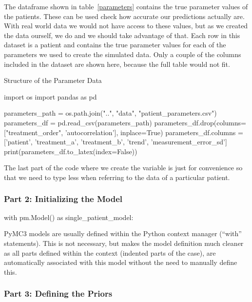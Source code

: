 \documentclass[12pt,a4paper,leqno]{report}
\theoremstyle{plain}
\theoremstyle{definition}
\theoremstyle{remark}
\begin{document}
The  dataframe shown in table\ \ref{parameters} contains the true parameter values of the patients. These
can be used check how accurate our predictions actually are. With real world data we would
not have access to these values, but as we created the data ourself, we do and we should
take advantage of that. Each row in this dataset is a patient and contains the
true parameter values for each of the parameters we used to create the simulated data.
Only a couple of the columns included in the dataset are shown here, because the full
table would not fit.

\bigskip
\begin{table}[H]
\caption{Structure of the Parameter Data}\label{parameters}
\bigskip
\centering
\begin{pycode}
import os
import pandas as pd

parameters_path = os.path.join("..", "data", "patient_parameters.csv")
parameters_df = pd.read_csv(parameters_path)
parameters_df.drop(columns=["treatment_order", 'autocorrelation'], inplace=True)
parameters_df.columns = ['patient', 'treatment_a', 'treatment_b', 'trend', 'measurement_error_sd']
print(parameters_df.to_latex(index=False))
\end{pycode}
\end{table}
\smallskip

The last part of the code where we create the variable  is just for
convenience so that we need to type less when referring to the data of a particular patient.

\subsubsection*{Part 2: Initializing the Model}

\bigskip
\begin{pyverbatim}[][fontsize=\footnotesize]
with pm.Model() as single_patient_model:
\end{pyverbatim}
\smallskip

PyMC3 models are usually defined within the Python context manager (``with'' statements).
This is not necessary, but makes the model definition much cleaner as all parts
defined within the context (indented parts of the case), are automatically associated
with this model without the need to manually define this.

\subsubsection*{Part 3: Defining the Priors}
\end{document}
